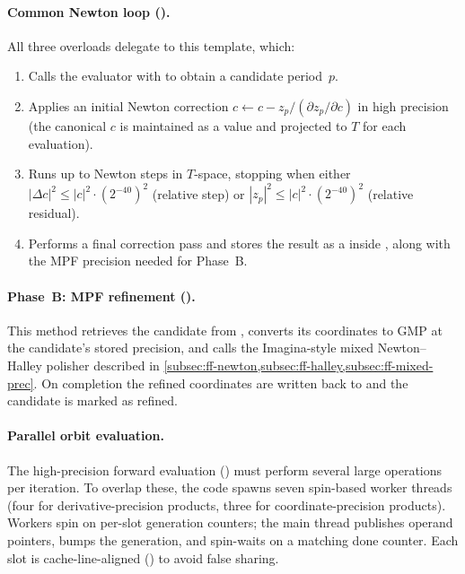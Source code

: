 \paragraph{Common Newton loop ().}
All three  overloads delegate to this template,
which:
\begin{enumerate}
\item Calls the evaluator with  to obtain a candidate
  period~$p$.
\item Applies an initial Newton correction
  $c \leftarrow c - z_p / (\partial z_p/\partial c)$ in high precision
  (the canonical $c$ is maintained as a  value and
  projected to $T$ for each evaluation).
\item Runs up to  Newton steps in $T$-space, stopping when
  either
  $|\Delta c|^2 \le |c|^2 \cdot (2^{-40})^2$ (relative step) or
  $|z_p|^2 \le |c|^2 \cdot (2^{-40})^2$ (relative residual).
\item Performs a final correction pass and stores the result as a
   inside , along with the
  MPF precision needed for Phase~B.
\end{enumerate}

\paragraph{Phase~B: MPF refinement ().}
This method retrieves the candidate from , converts
its coordinates to GMP  at the candidate's stored precision,
and calls the Imagina-style mixed Newton--Halley polisher described in
\cref{subsec:ff-newton,subsec:ff-halley,subsec:ff-mixed-prec}.  On
completion the refined coordinates are written back to 
and the candidate is marked as refined.

\paragraph{Parallel orbit evaluation.}
The high-precision forward evaluation
() must perform several large
 operations per iteration.  To overlap these, the code spawns
seven spin-based worker threads (four for derivative-precision products,
three for coordinate-precision products).  Workers spin on per-slot
 generation counters;
the main thread
publishes operand pointers, bumps the generation, and spin-waits on a
matching done counter.  Each slot is cache-line-aligned ()
to avoid false sharing.

